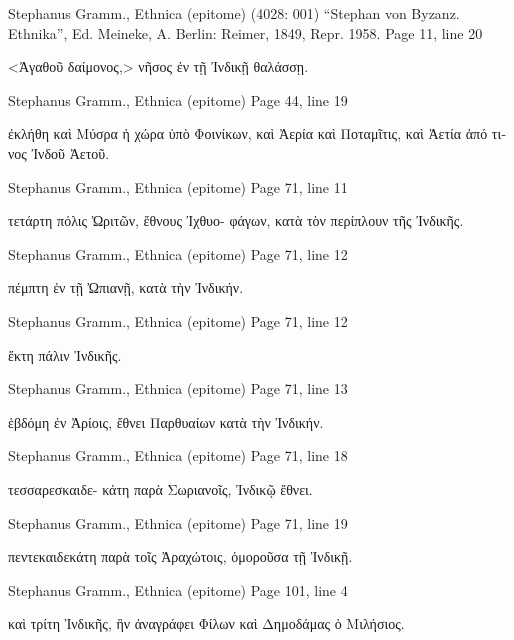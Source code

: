 \documentclass[12pt,letterpaper,twoside,final]{memoir}
\begin{document}
\begin{greek}

Stephanus Gramm., Ethnica (epitome) (4028: 001)
“Stephan von Byzanz. Ethnika”, Ed. Meineke, A.
Berlin: Reimer, 1849, Repr. 1958.
Page 11, line 20

<Ἀγαθοῦ δαίμονος,> νῆσος ἐν τῇ Ἰνδικῇ θαλάσσῃ. 



Stephanus Gramm., Ethnica (epitome) 
Page 44, line 19

       ἐκλήθη καὶ Μύσρα ἡ χώρα ὑπὸ Φοινίκων, καὶ Ἀερία 
καὶ Ποταμῖτις, καὶ Ἀετία ἀπό τινος Ἰνδοῦ Ἀετοῦ. 



Stephanus Gramm., Ethnica (epitome) 
Page 71, line 11

                           τετάρτη πόλις Ὠριτῶν, ἔθνους Ἰχθυο-
φάγων, κατὰ τὸν περίπλουν τῆς Ἰνδικῆς. 



Stephanus Gramm., Ethnica (epitome) 
Page 71, line 12

                                               πέμπτη ἐν τῇ 
Ὠπιανῇ, κατὰ τὴν Ἰνδικήν. 



Stephanus Gramm., Ethnica (epitome) 
Page 71, line 12

                                   ἕκτη πάλιν Ἰνδικῆς. 



Stephanus Gramm., Ethnica (epitome) 
Page 71, line 13

                                                             ἑβδόμη ἐν 
Ἀρίοις, ἔθνει Παρθυαίων κατὰ τὴν Ἰνδικήν. 



Stephanus Gramm., Ethnica (epitome) 
Page 71, line 18

                                                τεσσαρεσκαιδε-
κάτη παρὰ Σωριανοῖς, Ἰνδικῷ ἔθνει. 



Stephanus Gramm., Ethnica (epitome) 
Page 71, line 19

                                             πεντεκαιδεκάτη παρὰ 
τοῖς Ἀραχώτοις, ὁμοροῦσα τῇ Ἰνδικῇ. 



Stephanus Gramm., Ethnica (epitome) 
Page 101, line 4

                             καὶ τρίτη Ἰνδικῆς, ἣν ἀναγράφει 
Φίλων καὶ Δημοδάμας ὁ Μιλήσιος. 




\end{greek}
\end{document}
